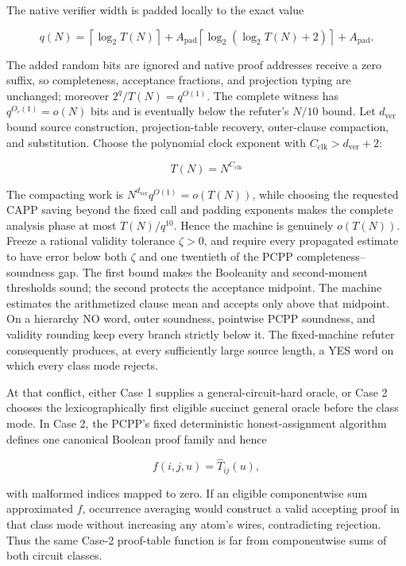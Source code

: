 \documentclass[11pt,letterpaper]{article}
\theoremstyle{definition}
\theoremstyle{remark}
\begin{document}
The native verifier width is padded locally to the exact value

\[
q(N)
{}={}
\left\lceil\log_2T(N)\right\rceil
{}+{}
A_{\mathrm{pad}}
\left\lceil\log_2(\log_2T(N)+2)\right\rceil
{}+{}
A_{\mathrm{pad}}.
\]

The added random bits are ignored and native proof addresses receive a
zero suffix, so completeness, acceptance fractions, and projection
typing are unchanged; moreover \(2^q/T(N)=q^{O(1)}\). The complete
witness has \(q^{O_c(1)}=o(N)\) bits and is eventually below the
refuter's \(N/10\) bound. Let \(d_{\mathrm{ver}}\) bound
source construction, projection-table recovery, outer-clause compaction,
and substitution. Choose the polynomial clock exponent with
\(C_{\mathrm{clk}}>d_{\mathrm{ver}}+2\):

\[
T(N)=N^{C_{\mathrm{clk}}}
\]

The compacting work is \(N^{d_{\mathrm{ver}}}q^{O(1)}=o(T(N))\), while
choosing the requested CAPP saving beyond the fixed call and padding
exponents makes the complete analysis phase at most \(T(N)/q^{10}\).
Hence the machine is genuinely \(o(T(N))\). Freeze a rational validity
tolerance \(\zeta>0\), and require every propagated estimate to have
error below both \(\zeta\) and one twentieth of the PCPP
completeness--soundness gap. The first bound makes the Booleanity and
second-moment thresholds sound; the second protects the acceptance
midpoint. The machine estimates the arithmetized clause mean and accepts
only above that midpoint. On a hierarchy NO word, outer soundness,
pointwise PCPP soundness, and validity rounding keep every branch
strictly below it. The fixed-machine refuter consequently produces, at
every sufficiently large source length, a YES word on which every class
mode rejects.

At that conflict, either Case 1 supplies a general-circuit-hard oracle,
or Case 2 chooses the lexicographically first eligible succinct general
oracle before the class mode. In Case 2, the PCPP's
fixed deterministic honest-assignment algorithm defines one canonical
Boolean proof family and hence

\[
f(i,j,u)=\widehat T_{ij}(u),
\]

with malformed indices mapped to zero. If an eligible componentwise sum
approximated \(f\), occurrence averaging would construct a valid
accepting proof in that class mode without increasing any
atom's wires, contradicting rejection. Thus the same
Case-2 proof-table function is far from componentwise sums of both
circuit classes.
\end{document}
